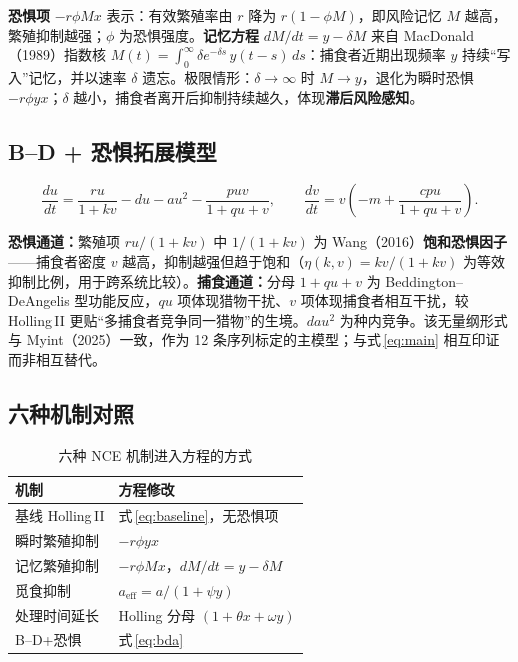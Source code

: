 \documentclass[12pt,a4paper]{ctexart}
\begin{document}
\textbf{恐惧项} $-r\phi Mx$ 表示：有效繁殖率由 $r$ 降为 $r(1-\phi M)$，即风险记忆 $M$ 越高，繁殖抑制越强；$\phi$ 为恐惧强度。\textbf{记忆方程} $dM/dt=y-\delta M$ 来自 MacDonald（1989）指数核
$M(t)=\int_0^\infty \delta e^{-\delta s}\,y(t-s)\,ds$：捕食者近期出现频率 $y$ 持续“写入”记忆，并以速率 $\delta$ 遗忘。极限情形：$\delta\to\infty$ 时 $M\to y$，退化为瞬时恐惧 $-r\phi yx$；$\delta$ 越小，捕食者离开后抑制持续越久，体现\textbf{滞后风险感知}。

\subsection{B--D + 恐惧拓展模型}

\begin{equation}
  \frac{du}{dt} = \frac{ru}{1+kv} - du - au^2 - \frac{puv}{1+qu+v},\qquad
  \frac{dv}{dt} = v\left(-m + \frac{cpu}{1+qu+v}\right).
  \label{eq:bda}
\end{equation}

\textbf{恐惧通道：}繁殖项 $ru/(1+kv)$ 中 $1/(1+kv)$ 为 Wang（2016）\textbf{饱和恐惧因子}——捕食者密度 $v$ 越高，抑制越强但趋于饱和（$\eta(k,v)=kv/(1+kv)$ 为等效抑制比例，用于跨系统比较）。\textbf{捕食通道：}分母 $1+qu+v$ 为 Beddington--DeAngelis 型功能反应，$qu$ 项体现猎物干扰、$v$ 项体现捕食者相互干扰，较 Holling\,II 更贴“多捕食者竞争同一猎物”的生境。$dau^2$ 为种内竞争。该无量纲形式与 Myint（2025）一致，作为 12 条序列标定的主模型；与式\,\eqref{eq:main} 相互印证而非相互替代。

\subsection{六种机制对照}

\begin{table}[H]
  \centering
  \caption{六种 NCE 机制进入方程的方式}
  \label{tab:mech}
  \small
  \begin{tabular}{p{3.2cm}p{9.8cm}}
    \toprule
    机制 & 方程修改 \\
    \midrule
    基线 Holling\,II & 式\,\eqref{eq:baseline}，无恐惧项 \\
    瞬时繁殖抑制 & $-r\phi yx$ \\
    记忆繁殖抑制 & $-r\phi Mx$，$dM/dt=y-\delta M$ \\
    觅食抑制 & $a_{\mathrm{eff}}=a/(1+\psi y)$ \\
    处理时间延长 & Holling 分母 $(1+\theta x+\omega y)$ \\
    B--D+恐惧 & 式\,\eqref{eq:bda} \\
    \bottomrule
  \end{tabular}
\end{table}
\end{document}

